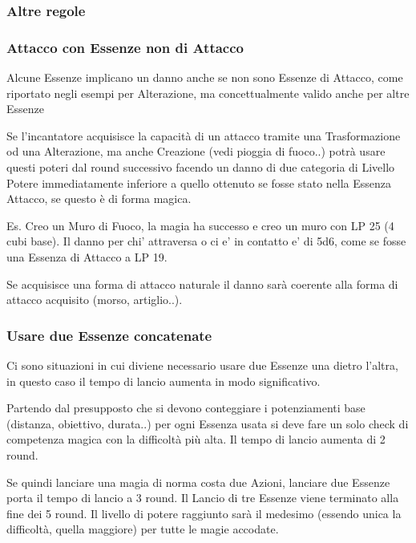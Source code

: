 \documentclass[a4paper,10 pt,twoside,openany]{book}
\begin{document}
\subsubsection{Altre regole}

\label{altre-regole}

\subsubsection{Attacco con Essenze non di Attacco}

Alcune Essenze implicano un danno anche se non sono Essenze di Attacco, come riportato negli esempi per Alterazione, ma concettualmente valido anche per altre Essenze

Se l'incantatore acquisisce la capacità di un attacco tramite una Trasformazione od una Alterazione, ma anche Creazione (vedi pioggia di fuoco..) potrà usare questi poteri dal round successivo facendo un danno di due categoria di Livello Potere immediatamente inferiore a quello ottenuto se fosse stato nella Essenza Attacco, se questo è di forma magica.

Es. Creo un Muro di Fuoco, la magia ha successo e creo un muro con LP 25 (4 cubi base). Il danno per chi' attraversa o ci e' in contatto e' di 5d6, come se fosse una Essenza di Attacco a LP 19.

Se acquisisce una forma di attacco naturale il danno sarà coerente alla forma di attacco acquisito (morso, artiglio..).

\subsubsection{Usare due Essenze concatenate}

Ci sono situazioni in cui diviene necessario usare due Essenze una dietro l'altra, in questo caso il tempo di lancio aumenta in modo significativo.

Partendo dal presupposto che si devono conteggiare i potenziamenti base (distanza, obiettivo, durata..) per ogni Essenza usata si deve fare un solo check di competenza magica con la difficoltà più alta. Il tempo di lancio aumenta di 2 round.

Se quindi lanciare una magia di norma costa due Azioni, lanciare due Essenze porta il tempo di lancio a 3 round. Il Lancio di tre Essenze viene terminato alla fine dei 5 round. Il livello di potere raggiunto sarà il medesimo (essendo unica la difficoltà, quella maggiore) per tutte le magie accodate.
\end{document}
